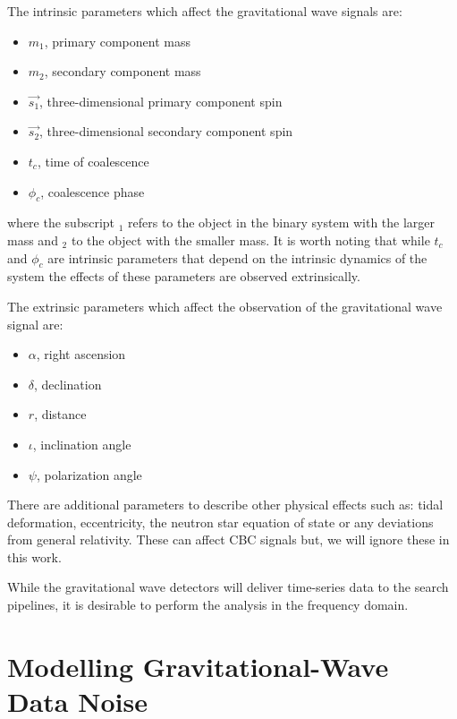 
The intrinsic parameters which affect the gravitational wave signals are:
\begin{itemize}
   \item $m_{1}$, primary component mass
   \item $m_{2}$, secondary component mass
   \item $\vec{s_{1}}$, three-dimensional primary component spin
   \item $\vec{s_{2}}$, three-dimensional secondary component spin
   \item $t_{c}$, time of coalescence
   \item $\phi_{c}$, coalescence phase
\end{itemize}
where the subscript $_1$ refers to the object in the binary system with the larger mass and $_2$ to the object with the smaller mass. It is worth noting that while $t_{c}$ and $\phi_{c}$ are intrinsic parameters that depend on the intrinsic dynamics of the system the effects of these parameters are observed extrinsically.

The extrinsic parameters which affect the observation of the gravitational wave signal are:
\begin{itemize}
   \item $\alpha$, right ascension
   \item $\delta$, declination
   \item $r$, distance
   \item $\iota$, inclination angle
   \item $\psi$, polarization angle
\end{itemize}

There are additional parameters to describe other physical effects such as: tidal deformation, eccentricity, the neutron star equation of state or any deviations from general relativity. These can affect CBC signals but, we will ignore these in this work.


While the gravitational wave detectors will deliver time-series data to the search pipelines, it is desirable to perform the analysis in the frequency domain.



\section{\label{2:sec:noise-model}Modelling Gravitational-Wave Data Noise}

